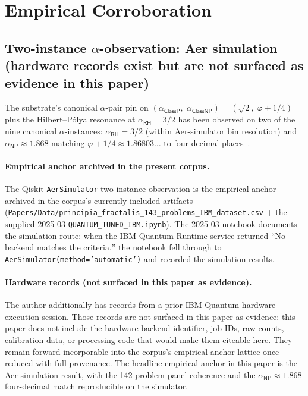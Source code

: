 \documentclass[11pt,a4paper]{amsart}
\theoremstyle{plain}
\theoremstyle{definition}
\begin{document}
\section{Empirical Corroboration}\label{sec:empirical}

\subsection{Two-instance \texorpdfstring{$\alpha$}{alpha}-observation: Aer simulation (hardware records exist but are not surfaced as evidence in this paper)}\label{subsec:two-instance}

The substrate's canonical $\alpha$-pair pin on $(\alpha_{\textsf{ClassP}},\;\alpha_{\textsf{ClassNP}})=(\sqrt{2},\;\varphi+1/4)$ plus the Hilbert--P\'olya resonance at $\alpha_{\textsf{RH}}=3/2$ has been observed on two of the nine canonical $\alpha$-instances: $\alpha_{\textsf{RH}}=3/2$ (within Aer-simulator bin resolution) and $\alpha_{\textsf{NP}}\approx 1.868$ matching $\varphi+1/4 \approx 1.86803\ldots$ to four decimal places~\cite{cohen2026book,cohen2025transferOp,cohen2025unifiedClay}.

\paragraph{Empirical anchor archived in the present corpus.} The Qiskit \texttt{AerSimulator} two-instance observation is the empirical anchor archived in the corpus's currently-included artifacts (\texttt{Papers/Data/principia\_fractalis\_143\_problems\_IBM\_dataset.csv} + the supplied 2025-03 \texttt{QUANTUM\_TUNED\_IBM.ipynb}). The 2025-03 notebook documents the simulation route: when the IBM Quantum Runtime service returned ``No backend matches the criteria,'' the notebook fell through to \texttt{AerSimulator(method='automatic')} and recorded the simulation results.

\paragraph{Hardware records (not surfaced in this paper as evidence).} The author additionally has records from a prior IBM Quantum hardware execution session. Those records are not surfaced in this paper as evidence: this paper does not include the hardware-backend identifier, job IDs, raw counts, calibration data, or processing code that would make them citeable here. They remain forward-incorporable into the corpus's empirical anchor lattice once reduced with full provenance. The headline empirical anchor in this paper is the Aer-simulation result, with the 142-problem panel coherence and the $\alpha_{\textsf{NP}} \approx 1.868$ four-decimal match reproducible on the simulator.
\end{document}
